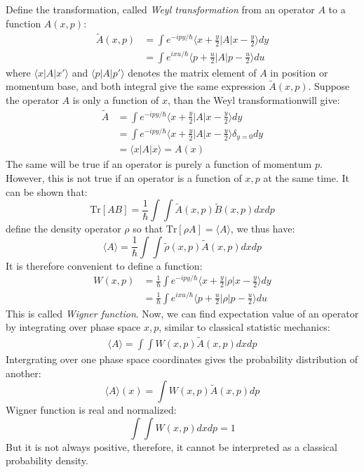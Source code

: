 \documentclass{article}
\begin{document}
Define the transformation, called \emph{Weyl transformation} from an operator $A$ to a function $A(x,p)$:
\begin{align}
    \tilde{A}(x,p)  &= \int e^{-ipy/\hbar} \langle x + \frac{y}{2} | A | x - \frac{y}{2} \rangle dy \\
                    &= \int e^{ ixu/\hbar} \langle p + \frac{u}{2} | A | p - \frac{u}{2} \rangle du
\end{align}
where $\langle x | A | x' \rangle$ and $\langle p | A | p' \rangle$ denotes the matrix element of $A$ 
in position or momentum base, and both integral give the same expression $\tilde{A}(x,p)$. 
Suppose the operator $A$ is only a function of $x$, than the Weyl transformationwill give:
\begin{align}
    \tilde{A} &= \int e^{-ipy/\hbar} \langle x + \frac{y}{2} | A | x - \frac{y}{2} \rangle dy \\
              &= \int e^{-ipy/\hbar} \langle x + \frac{y}{2} | A | x - \frac{y}{2} \rangle \delta_{y=0} dy \\
              &= \langle x | A | x \rangle = A(x)
\end{align}
The same will be true if an operator is purely a function of momentum $p$. However, this is not true 
if an operator is a function of $x,p$ at the same time.
It can be shown that:
\begin{equation}
    \text{Tr}[AB] = \frac{1}{\hbar} \int \int \tilde{A}(x,p) \tilde{B}(x,p) dx dp
\end{equation}
define the density operator $\rho$ so that $\text{Tr}[\rho A] = \langle A \rangle$, we thus have:
\begin{equation}
    \langle A \rangle = \frac{1}{\hbar} \int \int \tilde{\rho}(x,p) \tilde{A}(x,p) dx dp
\end{equation}
It is therefore convenient to define a function:
\begin{align}
    W(x,p)  &= \frac{1}{\hbar} \int e^{-ipy/\hbar} \langle x + \frac{y}{2} | \rho | x - \frac{y}{2} \rangle dy \\
            &= \frac{1}{\hbar} \int e^{ ixu/\hbar} \langle p + \frac{u}{2} | \rho | p - \frac{u}{2} \rangle du
\end{align}
This is called \emph{Wigner function}. Now, we can find expectation value of an operator by 
integrating over phase space $x,p$, similar to classical statistic mechanics:
\begin{align}
    \langle A \rangle = \int \int W(x,p) \tilde{A}(x,p) dx dp
\end{align}
Intergrating over one phase space coordinates gives the probability distribution of another:
\begin{equation}
    \langle A \rangle (x) = \int W(x,p) \tilde{A}(x,p) dp
\end{equation}
Wigner function is real and normalized:
\begin{equation}
    \int\int W(x,p) dx dp = 1
\end{equation}
But it is not always positive, therefore, it cannot be interpreted as a classical probability density.
\end{document}
